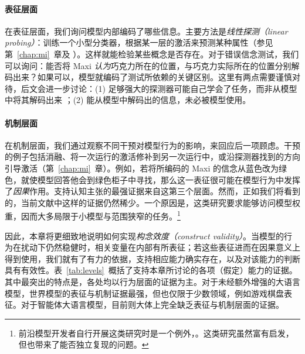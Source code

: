 \paragraph{表征层面} 在表征层面，我们询问模型内部编码了哪些信息。主要方法是{\em 线性探测（linear probing）}：训练一个小型分类器，根据某一层的激活来预测某种属性（参见第~\ref{chap:mi}~章及 \citet{alain2016understanding, belinkov2022probing}）。这样就能检验某些概念是否存在。对于错误信念测试，我们可以询问：能否将 Maxi {\em 认为}巧克力所在的位置，与巧克力实际所在的位置分别解码出来？如果可以，模型就编码了测试所依赖的关键区别。这里有两点需要谨慎对待，后文会进一步讨论：(1) 足够强大的探测器可能自己学会了任务，而非从模型中将其解码出来 \citep{hewitt2019designing}；(2) 能从模型中解码出的信息，未必被模型使用。

\paragraph{机制层面} 在机制层面，我们通过观察不同干预对模型行为的影响，来回应后一项顾虑。干预的例子包括消融、将一次运行的激活修补到另一次运行中，或沿探测器找到的方向引导激活（第~\ref{chap:mi}~章）。例如，若将所编码的 Maxi 的信念从蓝色改为绿色，就使模型回答他会到绿色柜子中寻找，那么这一表征很可能在模型行为中发挥了{\em 因果}作用。支持认知主张的最强证据来自这第三个层面。然而，正如我们将看到的，当前文献中这样的证据仍然稀少。一个原因是，这类研究要求能够访问模型权重，因而大多局限于小模型与范围狭窄的任务。\footnote{前沿模型开发者自行开展这类研究时是一个例外，\citep[例如][]{templeton2024scaling, lindsey2025biology}。这类研究虽然富有启发，但也带来了能否独立复现的问题。}

因此，本章将更细致地说明如何实现{\em 构念效度（construct validity）}。当模型的行为在扰动下仍然稳健时，相关变量在内部有所表征；若这些表征进而在因果意义上得到使用，我们就有了有力的依据，支持相应能力确实存在，以及对该能力的判断具有有效性。表~\ref{tab:levels}~概括了支持本章所讨论的各项（假定）能力的证据。其中最突出的特点是，各处均以行为层面的证据为主。对于未经额外增强的大语言模型，世界模型的表征与机制证据最强，但也仅限于少数领域，例如游戏棋盘表征。对于智能体大语言模型，目前则大体上完全缺乏表征与机制层面的证据。

